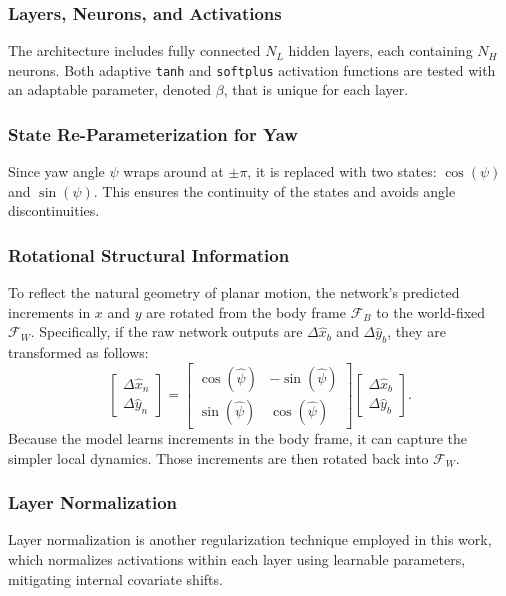 \subsubsection{Layers, Neurons, and Activations}
The architecture includes fully connected $N_L$ hidden layers, each containing $N_H$ neurons. Both adaptive \lstinline|tanh| and \lstinline|softplus| activation functions are tested with an adaptable parameter, denoted $\beta$, that is unique for each layer.

\subsubsection{State Re-Parameterization for Yaw}
Since yaw angle $\psi$ wraps around at $\pm\pi$, it is replaced with two states: $\cos(\psi)$ and $\sin(\psi)$. This ensures the continuity of the states and avoids angle discontinuities. 

\subsubsection{Rotational Structural Information}
To reflect the natural geometry of planar motion, the network’s predicted increments in $x$ and $y$ are rotated from the body frame $\mathcal{F}_B$ to the world-fixed $\mathcal{F}_W$. Specifically, if the raw network outputs are $\Delta \hat{x}_b$ and $\Delta \hat{y}_b$, they are transformed as follows:
\begin{equation}
    \begin{bmatrix}
        \Delta\hat{x}_n\\
        \Delta\hat{y}_n
    \end{bmatrix}=
    \begin{bmatrix}
        \cos(\hat{\psi}) & -\sin(\hat{\psi})\\
        \sin(\hat{\psi}) & \cos(\hat{\psi})
    \end{bmatrix}
    \begin{bmatrix}
        \Delta\hat{x}_b\\
        \Delta\hat{y}_b
    \end{bmatrix}.
\end{equation}
Because the model learns increments in the body frame, it can capture the simpler local dynamics. Those increments are then rotated back into $\mathcal{F}_W$.

\subsubsection{Layer Normalization} 
Layer normalization \cite{ba_layer_2016} is another regularization technique employed in this work, which normalizes activations within each layer using learnable parameters, mitigating internal covariate shifts. 

